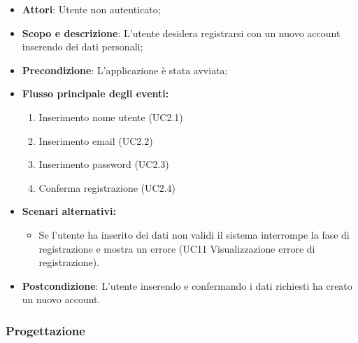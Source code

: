                 \begin{itemize}
                    \item\textbf{Attori}: Utente non autenticato;
                    \item\textbf{Scopo e descrizione}: L’utente desidera registrarsi con un nuovo account inserendo dei dati personali;
                    \item\textbf{Precondizione}: L’applicazione è stata avviata;
                    \item\textbf{Flusso principale degli eventi:}
                        \begin{enumerate}
                            \item Inserimento nome utente (UC2.1)
                            \item Inserimento email (UC2.2)
                            \item Inserimento password (UC2.3)
                            \item Conferma registrazione (UC2.4)
                        \end{enumerate}
                    \item\textbf{Scenari alternativi:}
                        \begin{itemize}
                            \item Se l’utente ha inserito dei dati non validi il sistema interrompe la fase di registrazione e mostra un errore (UC11 Visualizzazione errore di registrazione).
                        \end{itemize}
                    \item\textbf{Postcondizione}: L’utente inserendo e confermando i dati richiesti ha creato un nuovo account.
                \end{itemize}
            

        \subsubsection{Progettazione}
